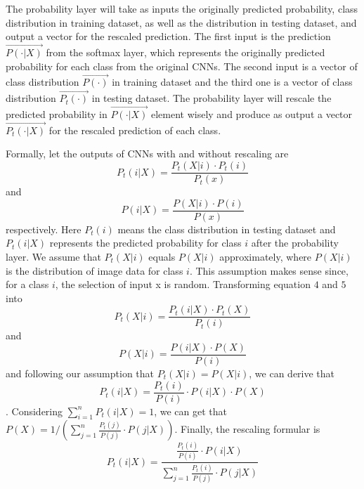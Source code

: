\documentclass{article}
\begin{document}
The probability layer will take as inputs the originally predicted probability, class distribution in training dataset, as well as the distribution in testing dataset, and output a vector for the rescaled prediction. The first input is the prediction $\vec{P(\cdot|X)}$ from the softmax layer, which represents the originally predicted probability for each class from the original CNNs. The second input is a vector of class distribution $\vec{P(\cdot)}$ in training dataset and the third one is a vector of class distribution $\vec{P_t(\cdot)}$ in testing dataset. The probability layer will rescale the predicted probability in $\vec{P(\cdot|X)}$ element wisely and produce as output a vector $\vec{P_t(\cdot|X)}$ for the rescaled prediction of each class.

Formally, let the outputs of CNNs with and without rescaling are
\begin{equation}
    P_t(i|X) = \frac{P_t(X|i) \cdot P_t(i)}{P_t(x)}
\end{equation}
and
\begin{equation}
    P(i|X) = \frac{P(X|i) \cdot P(i)}{P(x)}
\end{equation}
respectively. Here $P_t(i)$ means the class distribution in testing dataset and $P_t(i|X)$ represents the predicted probability for class $i$ after the probability layer. We assume that $P_t(X|i)$ equals $P(X|i)$ approximately, where $P(X|i)$ is the distribution of image data for class $i$. This assumption makes sense since, for a class $i$, the selection of input x is random. Transforming equation $4$ and $5$ into 
\begin{equation}
    P_t(X|i) = \frac{P_t(i|X) \cdot P_t(X)}{P_t(i)}
\end{equation}
and
\begin{equation}
    P(X|i) = \frac{P(i|X) \cdot P(X)}{P(i)}
\end{equation}
and following our assumption that $P_t(X|i) = P(X|i)$, we can derive that 
\begin{equation}
    P_t(i|X) = \frac{P_t(i)}{P(i)}\cdot P(i|X) \cdot P(X) 
\end{equation}. Considering $\sum_{i=1}^n P_t(i|X) = 1$, we can get that $P(X) = 1/(\sum_{j=1}^{n} \frac{P_t(j)}{P(j)} \cdot P(j|X))$. Finally, the rescaling formular is 
\begin{equation}
    P_t(i|X) = \frac{\frac{P_t(i)}{P(i)} \cdot P(i|X)}{\sum_{j=1}^n \frac{P_t(i)}{P(j)} \cdot P(j|X)}
\end{equation}
\end{document}
